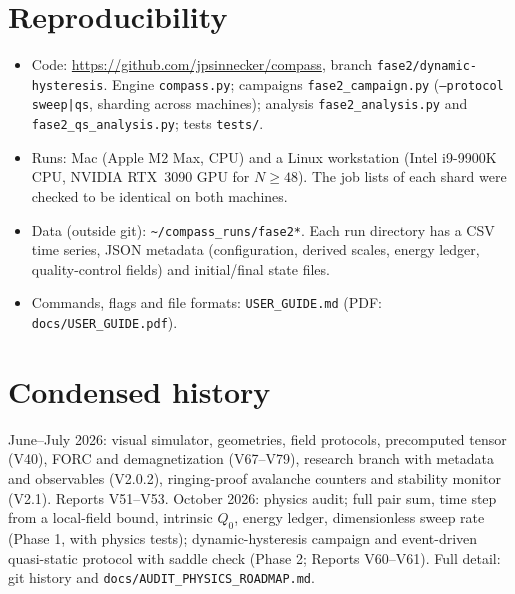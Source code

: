 \documentclass[11pt,a4paper]{article}
\newcommand{\code}[1]{\texttt{#1}}
\begin{document}
\appendix
\section{Reproducibility}
\label{app:repro}

\begin{itemize}[leftmargin=*]
\item Code: \url{https://github.com/jpsinnecker/compass}, branch \code{fase2/dynamic-hysteresis}. Engine \code{compass.py}; campaigns \code{fase2\_campaign.py} (\code{--protocol sweep|qs}, sharding across machines); analysis \code{fase2\_analysis.py} and \code{fase2\_qs\_analysis.py}; tests \code{tests/}.
\item Runs: Mac (Apple M2 Max, CPU) and a Linux workstation (Intel i9-9900K CPU, NVIDIA RTX~3090 GPU for $N\ge48$). The job lists of each shard were checked to be identical on both machines.
\item Data (outside git): \code{\textasciitilde/compass\_runs/fase2*}. Each run directory has a CSV time series, JSON metadata (configuration, derived scales, energy ledger, quality-control fields) and initial/final state files.
\item Commands, flags and file formats: \code{USER\_GUIDE.md} (PDF: \code{docs/USER\_GUIDE.pdf}).
\end{itemize}

\section{Condensed history}
\label{app:history}

June--July 2026: visual simulator, geometries, field protocols, precomputed tensor (V40), FORC and demagnetization (V67--V79), research branch with metadata and observables (V2.0.2), ringing-proof avalanche counters and stability monitor (V2.1). Reports V51--V53.
October 2026: physics audit; full pair sum, time step from a local-field bound, intrinsic $Q_0$, energy ledger, dimensionless sweep rate (Phase 1, with physics tests); dynamic-hysteresis campaign and event-driven quasi-static protocol with saddle check (Phase 2; Reports V60--V61). Full detail: git history and \code{docs/AUDIT\_PHYSICS\_ROADMAP.md}.
\end{document}
